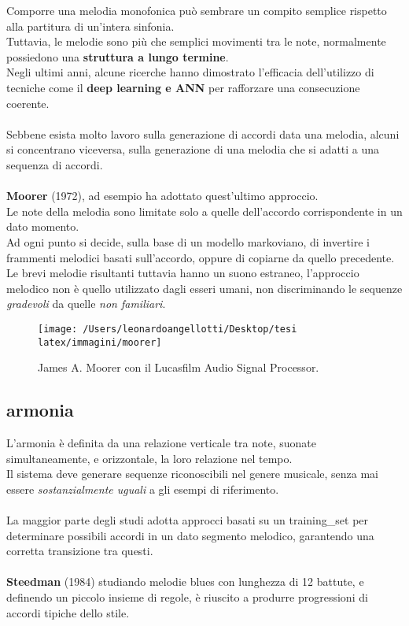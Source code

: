 \documentclass[a4paper,12pt]{report}
\begin{document}
Comporre una melodia monofonica può sembrare un compito semplice rispetto alla partitura di un'intera sinfonia. \\
Tuttavia, le melodie sono più che semplici movimenti tra le note, normalmente possiedono una \textbf{struttura a lungo termine}. \\
Negli ultimi anni, alcune ricerche hanno dimostrato l’efficacia dell’utilizzo di tecniche come il \textbf{deep learning e ANN} per rafforzare una consecuzione coerente. \\
\\
Sebbene esista molto lavoro sulla generazione di accordi data una melodia, alcuni si concentrano viceversa, sulla generazione di una melodia che si adatti a una sequenza di accordi. \\
\\
\textbf{Moorer} (1972), ad esempio ha adottato quest'ultimo approccio. \\
Le note della melodia sono limitate solo a quelle dell'accordo corrispondente in un dato momento. \\
Ad ogni punto si decide, sulla base di un modello markoviano, di invertire i frammenti melodici basati sull'accordo, oppure di copiarne da quello precedente. \\
Le brevi melodie risultanti tuttavia hanno un suono estraneo, l'approccio melodico non è quello utilizzato dagli esseri umani, non discriminando le sequenze \textit{gradevoli} da quelle \textit{non familiari}. 

\begin{figure}[H]
    \centering
    \texttt{[image: /Users/leonardoangellotti/Desktop/tesi latex/immagini/moorer]} 
    \caption{James A. Moorer con il Lucasfilm Audio Signal Processor.}
    \label{fig:immagine15}
\end{figure}

\subsection{armonia}

L'armonia è definita da una relazione verticale tra note, suonate simultaneamente, e orizzontale, la loro relazione nel tempo. \\
Il sistema deve generare sequenze riconoscibili nel genere musicale, senza mai essere \textit{sostanzialmente uguali} a gli esempi di riferimento. \\
\\
La maggior parte degli studi adotta approcci basati su un training\_set per determinare possibili accordi in un dato segmento melodico, garantendo una corretta transizione tra questi. \\
\\
\textbf{Steedman} (1984) studiando melodie blues con lunghezza di 12 battute, e definendo un piccolo insieme di regole, è riuscito a produrre progressioni di accordi tipiche dello stile. 
\end{document}
